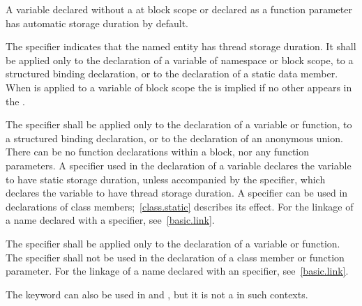 \pnum
\begin{note}
A variable declared without a 
at block scope or declared as a function parameter
has automatic storage duration by default.
\end{note}

\pnum
The  specifier
indicates that the named entity has thread storage duration. It
shall be applied only
to the declaration of a variable of namespace or block scope,
to a structured binding declaration, or
to the declaration of a static data member.
When  is applied to a variable of block scope the
  is implied if no other
 appears in the
.

\pnum
{}%
The  specifier shall be applied only
to the declaration of a variable or function,
to a structured binding declaration, or
to the declaration of an anonymous union.
There can be no
 function declarations within a block, nor any
 function parameters. A  specifier used in
the declaration of a variable declares the variable to have static storage
duration, unless accompanied by the
 specifier, which declares the variable to have thread
storage duration. A  specifier can be
used in declarations of class members;~\ref{class.static} describes its
effect.
%
For the linkage of a name declared with a  specifier,
see~\ref{basic.link}.

\pnum
{}%
The  specifier shall be applied only to the declaration of a variable
or function. The  specifier shall not be used in the
declaration of a class member or function parameter.
%
%
For the linkage of a name declared with an  specifier,
see~\ref{basic.link}.
\begin{note}
The  keyword can also be used in
 and
, but it is not a
 in such contexts.
\end{note}


